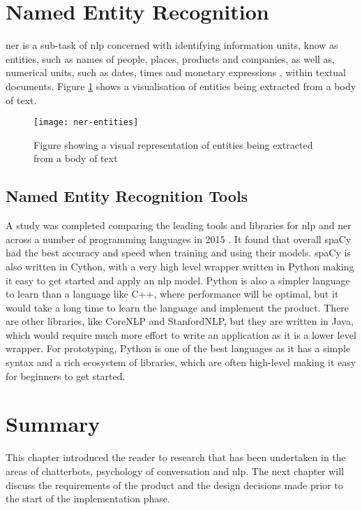\section{Named Entity Recognition} \label{section: ner}
\gls{ner} is a sub-task of \gls{nlp} concerned with identifying information units, know as entities, such as names of people, places, products and companies, as well as, numerical units, such as dates, times and monetary expressions \autocite{nadeau2007survey}, within textual documents. Figure \ref{fig:ner-entities} shows a visualisation of entities being extracted from a body of text.\\
\begin{figure}[h]
	\centering
	\texttt{[image: ner-entities]}
	\caption{Figure showing a visual representation of entities being extracted from a body of text}
	\label{fig:ner-entities}
\end{figure}
\subsection{Named Entity Recognition Tools}
A study was completed comparing the leading tools and libraries for \gls{nlp} and \gls{ner} across a number of programming languages in 2015 \autocite{choi2015depends}. It found that overall spaCy had the best accuracy and speed when training and using their models. spaCy is also written in Cython, with a very high level wrapper written in Python making it easy to get started and apply an \gls{nlp} model. Python is also a simpler language to learn than a language like C++, where performance will be optimal, but it would take a long time to learn the language and implement the product. There are other libraries, like CoreNLP and StanfordNLP, but they are written in Java, which would require much more effort to write an application as it is a lower level wrapper. For prototyping, Python is one of the best languages as it has a simple syntax and a rich ecosystem of libraries, which are often high-level making it easy for beginners to get started.
\section{Summary}
This chapter introduced the reader to research that has been undertaken in the areas of chatterbots, psychology of conversation and \gls{nlp}. The next chapter will discuss the requirements of the product and the design decisions made prior to the start of the implementation phase.